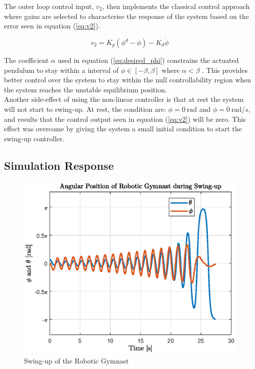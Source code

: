 The outer loop control input, $v_{2}$, then implements the classical control approach where gains are selected to characterise the response of the system based on the error seen in equation (\ref{eq:v2}). 

   
\begin{equation} \label{eq:v2}
v_{2} = K_{p}(\phi^{d}-\phi)-K_{d}\dot{\phi}
\end{equation}

The coefficient $\alpha$ used in equation (\ref{eq:desired_phi}) constrains the actuated pendulum to stay within a interval of $ \phi \in [-\beta,\beta]$ where $\alpha < \beta$ \citep{spong_swingup}. This provides better control over the system to stay within the null controllability region when the system reaches the unstable equilibrium position.\\

Another side-effect of using the non-linear controller is that at rest the system will not start to swing-up. At rest, the condition are: $\phi = \SI{0}{\radian}$ and $\dot{\phi} = \SI{0}{\radian/s}$, and results that the control output seen in equation (\ref{eq:v2}) will be zero. This effect was overcome by giving the system a small initial condition to start the swing-up controller.


\subsection{Simulation Response}
\begin{figure}[h]
	\centering
	\includegraphics[scale=1]{./figs/swingup}
	\caption{Swing-up of the Robotic Gymnast}
	\label{fig:swingup}
\end{figure}

